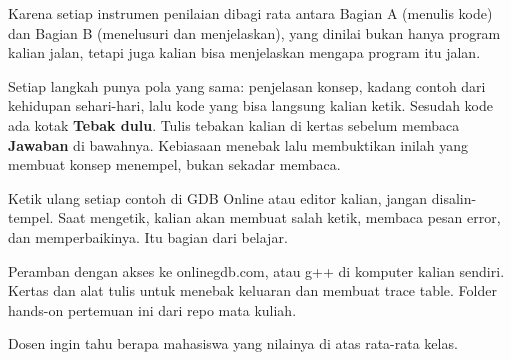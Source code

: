 \documentclass[a4paper]{article}
\begin{document}
\par\vspace{4pt}\par\vspace{6pt}
Karena setiap instrumen penilaian dibagi rata antara Bagian A (menulis kode) dan Bagian B (menelusuri dan menjelaskan), yang dinilai bukan hanya program kalian jalan, tetapi juga kalian bisa menjelaskan mengapa program itu jalan.

Setiap langkah punya pola yang sama: penjelasan konsep, kadang contoh dari kehidupan sehari-hari, lalu kode yang bisa langsung kalian ketik. Sesudah kode ada kotak \textbf{Tebak dulu}. Tulis tebakan kalian di kertas sebelum membaca \textbf{Jawaban} di bawahnya. Kebiasaan menebak lalu membuktikan inilah yang membuat konsep menempel, bukan sekadar membaca.

\begin{Penting}
Ketik ulang setiap contoh di GDB Online atau editor kalian, jangan disalin-tempel. Saat mengetik, kalian akan membuat salah ketik, membaca pesan error, dan memperbaikinya. Itu bagian dari belajar.
\end{Penting}
Peramban dengan akses ke onlinegdb.com, atau g++ di komputer kalian sendiri. Kertas dan alat tulis untuk menebak keluaran dan membuat trace table. Folder hands-on pertemuan ini dari repo mata kuliah.

Dosen ingin tahu berapa mahasiswa yang nilainya di atas rata-rata kelas.
\end{document}
